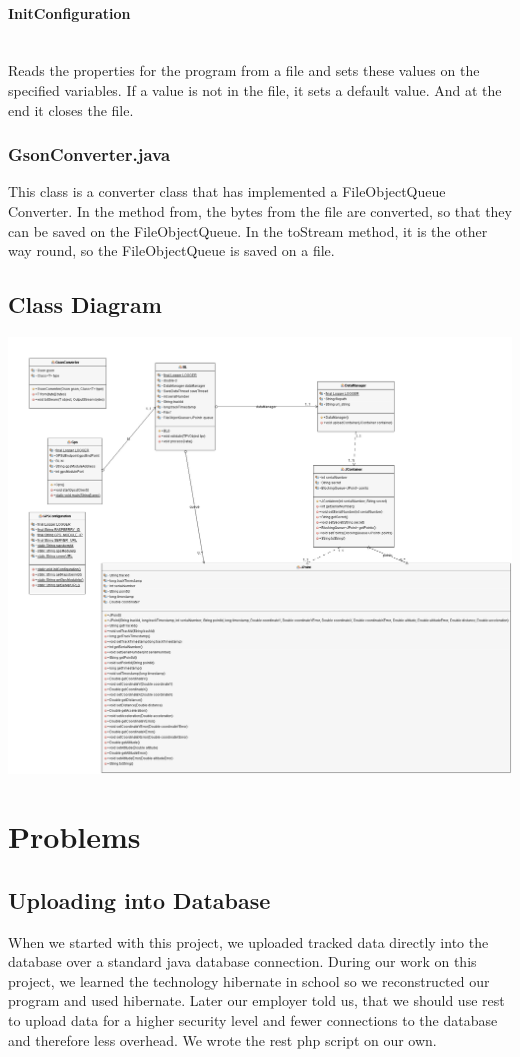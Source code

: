 \paragraph{InitConfiguration}\mbox{}\\
Reads the properties for the program from a file and sets these values on the specified variables. If a value is not in the file, it sets a default value. And at the end it closes the file.
\subsubsection{GsonConverter.java}
This class is a converter class that has implemented a FileObjectQueue Converter. In the method from, the bytes from the file are converted, so that they can be saved on the FileObjectQueue. In the toStream method, it is the other way round, so the FileObjectQueue is saved on a file.
\subsection{Class Diagram}
\begin{center}
\includegraphics[width=1\textwidth]{bilder/GPS_REST_UML_Diagram}
\end{center}
\section{Problems}
\subsection{Uploading into Database}
When we started with this project, we uploaded tracked data directly into the database over a standard java database connection. During our work on this project, we learned the technology hibernate in school so we reconstructed our program and used hibernate. Later our employer told us, that we should use \gls{rest} to upload data for a higher security level and fewer connections to the database and therefore less overhead. We wrote the \gls{rest} \gls{php} script on our own. 
